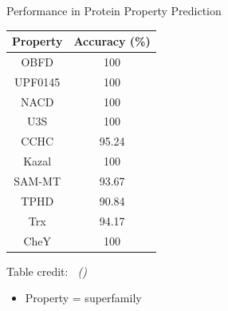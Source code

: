 \documentclass[dvipsnames,
hyperref={citecolor=black}
]{beamer}
\newcommand{\credit}[2]{{\par\hfill \tiny #1 credit:~\itshape\citeauthor{#2} (\citeyear{#2})}}
\begin{document}
\begin{frame}{Performance in Protein Property Prediction}
	\begin{center}
		\begin{tabular}{cc}\hline
			Property & Accuracy (\%) \\\hline
			OBFD     & 100 \\
			UPF0145  & 100 \\
			NACD     & 100 \\
			U3S      & 100 \\
			CCHC     & 95.24  \\
			Kazal    & 100 \\
			SAM-MT   & 93.67  \\
			TPHD     & 90.84  \\
			Trx      & 94.17  \\
			CheY     & 100 \\\hline
		\end{tabular}
	\end{center}
	\credit{Table}{lv2024prollama}
	\begin{itemize}
		\item Property = superfamily
	\end{itemize}
\end{frame}
\end{document}
